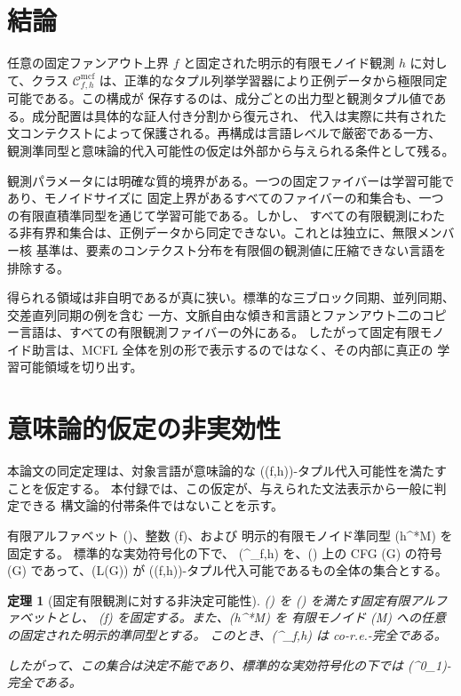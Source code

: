 \documentclass[11pt,a4paper]{ltjsarticle}
\newtheorem{theorem}{定理}[section]
\theoremstyle{remark}
\newcommand{\Cmcf}[2]{\mathcal{C}^{\mathrm{mcf}}_{#1,#2}}
\begin{document}
\section{結論}
\label{sec:conclusion}

任意の固定ファンアウト上界 \(f\) と固定された明示的有限モノイド観測 \(h\) に対して、クラス
\(\Cmcf{f}{h}\) は、正準的なタプル列挙学習器により正例データから極限同定可能である。この構成が
保存するのは、成分ごとの出力型と観測タプル値である。成分配置は具体的な証人付き分割から復元され、
代入は実際に共有された文コンテクストによって保護される。再構成は言語レベルで厳密である一方、
観測準同型と意味論的代入可能性の仮定は外部から与えられる条件として残る。

観測パラメータには明確な質的境界がある。一つの固定ファイバーは学習可能であり、モノイドサイズに
固定上界があるすべてのファイバーの和集合も、一つの有限直積準同型を通じて学習可能である。しかし、
すべての有限観測にわたる非有界和集合は、正例データから同定できない。これとは独立に、無限メンバー核
基準は、要素のコンテクスト分布を有限個の観測値に圧縮できない言語を排除する。

得られる領域は非自明であるが真に狭い。標準的な三ブロック同期、並列同期、交差直列同期の例を含む
一方、文脈自由な傾き和言語とファンアウト二のコピー言語は、すべての有限観測ファイバーの外にある。
したがって固定有限モノイド助言は、MCFL 全体を別の形で表示するのではなく、その内部に真正の
学習可能領域を切り出す。


\appendix
\section{意味論的仮定の非実効性}
\label{app:semantic-promise}

本論文の同定定理は、対象言語が意味論的な
((f,h))-タプル代入可能性を満たすことを仮定する。
本付録では、この仮定が、与えられた文法表示から一般に判定できる
構文論的付帯条件ではないことを示す。

有限アルファベット (\Sigma)、整数 (f)、および
明示的有限モノイド準同型 (h\colon\Sigma^*\to M) を固定する。
標準的な実効符号化の下で、
(^{}_{f,h}) を、(\Sigma) 上の CFG (G) の符号
(\langle G\rangle) であって、(L(G)) が
((f,h))-タプル代入可能であるもの全体の集合とする。

\begin{theorem}[固定有限観測に対する非決定可能性]
\label{thm:promise-undecidable}
(\Sigma) を (\lvert\Sigma\rvert{}) を満たす固定有限アルファベットとし、
(f) を固定する。また、(h\colon\Sigma^*\to M) を
有限モノイド (M) への任意の固定された明示的準同型とする。
このとき、(^{}_{f,h}) は
co-r.e.-完全である。

したがって、この集合は決定不能であり、標準的な実効符号化の下では
(\Pi^0_1)-完全である。
\end{theorem}
\end{document}
